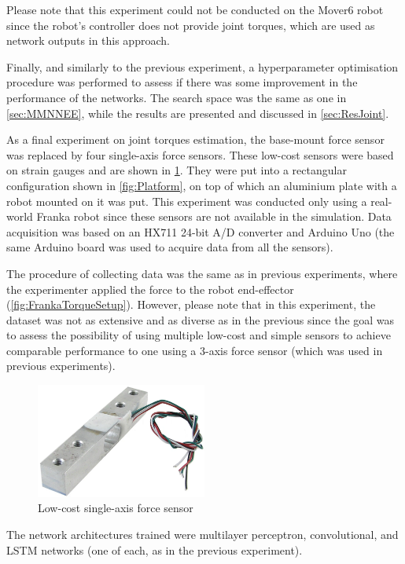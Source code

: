 Please note that this experiment could not be conducted on the Mover6 robot since the robot's controller does not provide joint torques, which are used as network outputs in this approach.

Finally, and similarly to the previous experiment, a hyperparameter optimisation procedure was performed to assess if there was some improvement in the performance of the networks. The search space was the same as one in \cref{sec:MMNNEE}, while the results are presented and discussed in \cref{sec:ResJoint}.

As a final experiment on joint torques estimation, the base-mount force sensor was replaced by four single-axis force sensors. These low-cost sensors were based on strain gauges and are shown in \cref{fig:StrainGauge}. They were put into a rectangular configuration shown in \cref{fig:Platform}, on top of which an aluminium plate with a robot mounted on it was put. This experiment was conducted only using a real-world Franka robot since these sensors are not available in the simulation. Data acquisition was based on an HX711 24-bit A/D converter and Arduino Uno (the same Arduino board was used to acquire data from all the sensors).

The procedure of collecting data was the same as in previous experiments, where the experimenter applied the force to the robot end-effector (\cref{fig:FrankaTorqueSetup}). However, please note that in this experiment, the dataset was not as extensive and as diverse as in the previous since the goal was to assess the possibility of using multiple low-cost and simple sensors to achieve comparable performance to one using a 3-axis force sensor (which was used in previous experiments).

\begin{figure}
    \centering
    \includegraphics[width=0.5\textwidth]{slike/Fig03_27.png}
    \caption{Low-cost single-axis force sensor}
    \label{fig:StrainGauge}
\end{figure}

The network architectures trained were multilayer perceptron, convolutional, and LSTM networks (one of each, as in the previous experiment).

